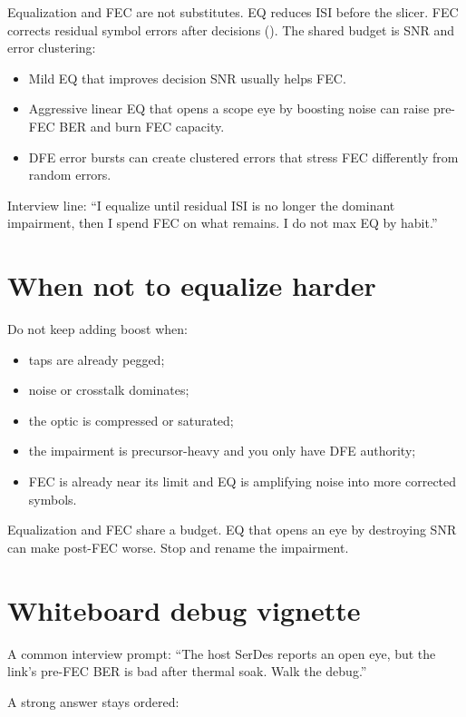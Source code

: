 Equalization and FEC are not substitutes. EQ reduces ISI before the slicer.
FEC corrects residual symbol errors after decisions (). The shared
budget is SNR and error clustering:

\begin{itemize}
\item Mild EQ that improves decision SNR usually helps FEC.
\item Aggressive linear EQ that opens a scope eye by boosting noise can raise
      pre-FEC BER and burn FEC capacity.
\item DFE error bursts can create clustered errors that stress FEC differently
      from random errors.
\end{itemize}

Interview line: ``I equalize until residual ISI is no longer the dominant
impairment, then I spend FEC on what remains. I do not max EQ by habit.''

\section{When not to equalize harder}
\label{sec:eq-when-not}

Do not keep adding boost when:

\begin{itemize}
\item taps are already pegged;
\item noise or crosstalk dominates;
\item the optic is compressed or saturated;
\item the impairment is precursor-heavy and you only have DFE authority;
\item FEC is already near its limit and EQ is amplifying noise into more
      corrected symbols.
\end{itemize}

Equalization and FEC share a budget. EQ that opens an eye by destroying SNR can
make post-FEC worse. Stop and rename the impairment.

\section{Whiteboard debug vignette}
\label{sec:eq-debug-vignette}

A common interview prompt: ``The host SerDes reports an open eye, but the
link's pre-FEC BER is bad after thermal soak. Walk the debug.''

A strong answer stays ordered:

